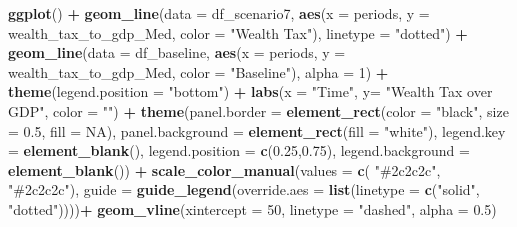 \documentclass[
]{article}
\newenvironment{Shaded}{\begin{snugshade}}{\end{snugshade}}
\newcommand{\AttributeTok}[1]{\textcolor[rgb]{0.13,0.29,0.53}{#1}}
\newcommand{\ConstantTok}[1]{\textcolor[rgb]{0.56,0.35,0.01}{#1}}
\newcommand{\DecValTok}[1]{\textcolor[rgb]{0.00,0.00,0.81}{#1}}
\newcommand{\FloatTok}[1]{\textcolor[rgb]{0.00,0.00,0.81}{#1}}
\newcommand{\FunctionTok}[1]{\textcolor[rgb]{0.13,0.29,0.53}{\textbf{#1}}}
\newcommand{\NormalTok}[1]{#1}
\newcommand{\SpecialCharTok}[1]{\textcolor[rgb]{0.81,0.36,0.00}{\textbf{#1}}}
\newcommand{\StringTok}[1]{\textcolor[rgb]{0.31,0.60,0.02}{#1}}
\begin{document}
\begin{Shaded}
\begin{Highlighting}[]
\FunctionTok{ggplot}\NormalTok{() }\SpecialCharTok{+}
  \FunctionTok{geom\_line}\NormalTok{(}\AttributeTok{data =}\NormalTok{ df\_scenario7, }\FunctionTok{aes}\NormalTok{(}\AttributeTok{x =}\NormalTok{ periods, }\AttributeTok{y =}\NormalTok{ wealth\_tax\_to\_gdp\_Med, }\AttributeTok{color =} \StringTok{"Wealth Tax"}\NormalTok{), }\AttributeTok{linetype =} \StringTok{"dotted"}\NormalTok{) }\SpecialCharTok{+}
  \FunctionTok{geom\_line}\NormalTok{(}\AttributeTok{data =}\NormalTok{ df\_baseline, }\FunctionTok{aes}\NormalTok{(}\AttributeTok{x =}\NormalTok{ periods, }\AttributeTok{y =}\NormalTok{ wealth\_tax\_to\_gdp\_Med, }\AttributeTok{color =} \StringTok{"Baseline"}\NormalTok{), }\AttributeTok{alpha =} \DecValTok{1}\NormalTok{) }\SpecialCharTok{+}
  \FunctionTok{theme}\NormalTok{(}\AttributeTok{legend.position =} \StringTok{"bottom"}\NormalTok{) }\SpecialCharTok{+}
  \FunctionTok{labs}\NormalTok{(}\AttributeTok{x =} \StringTok{"Time"}\NormalTok{, }\AttributeTok{y=} \StringTok{"Wealth Tax over GDP"}\NormalTok{, }\AttributeTok{color =} \StringTok{""}\NormalTok{) }\SpecialCharTok{+}
  \FunctionTok{theme}\NormalTok{(}\AttributeTok{panel.border =} \FunctionTok{element\_rect}\NormalTok{(}\AttributeTok{color =} \StringTok{"black"}\NormalTok{, }\AttributeTok{size =} \FloatTok{0.5}\NormalTok{, }\AttributeTok{fill =} \ConstantTok{NA}\NormalTok{),}
        \AttributeTok{panel.background =} \FunctionTok{element\_rect}\NormalTok{(}\AttributeTok{fill =} \StringTok{"white"}\NormalTok{),}
        \AttributeTok{legend.key =} \FunctionTok{element\_blank}\NormalTok{(),}
        \AttributeTok{legend.position =} \FunctionTok{c}\NormalTok{(}\FloatTok{0.25}\NormalTok{,}\FloatTok{0.75}\NormalTok{),}
        \AttributeTok{legend.background =} \FunctionTok{element\_blank}\NormalTok{()) }\SpecialCharTok{+}
  \FunctionTok{scale\_color\_manual}\NormalTok{(}\AttributeTok{values =} \FunctionTok{c}\NormalTok{(  }\StringTok{"\#2c2c2c"}\NormalTok{, }\StringTok{"\#2c2c2c"}\NormalTok{),}
                     \AttributeTok{guide =} \FunctionTok{guide\_legend}\NormalTok{(}\AttributeTok{override.aes =} \FunctionTok{list}\NormalTok{(}\AttributeTok{linetype =} \FunctionTok{c}\NormalTok{(}\StringTok{"solid"}\NormalTok{, }\StringTok{"dotted"}\NormalTok{))))}\SpecialCharTok{+}
  \FunctionTok{geom\_vline}\NormalTok{(}\AttributeTok{xintercept =} \DecValTok{50}\NormalTok{, }\AttributeTok{linetype =} \StringTok{"dashed"}\NormalTok{, }\AttributeTok{alpha =} \FloatTok{0.5}\NormalTok{)}
\end{Highlighting}
\end{Shaded}
\end{document}
